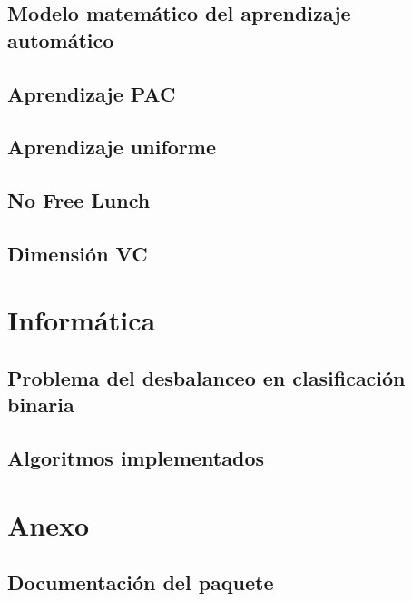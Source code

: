 \documentclass[dottedtoc, headinclude, footinclude=true]{scrreprt}
\begin{document}
  \chapter{Modelo matemático del aprendizaje automático}
    
  \chapter{Aprendizaje PAC}
    
  \chapter{Aprendizaje uniforme}
    
  \chapter{No Free Lunch}
    
  \chapter{Dimensión VC}
    
  
\part{Informática}
  \chapter{Problema del desbalanceo en clasificación binaria}
    
  \chapter{Algoritmos implementados}
    
    
    
    
    

\part*{Anexo}
  \chapter*{Documentación del paquete}
    


\end{document}
